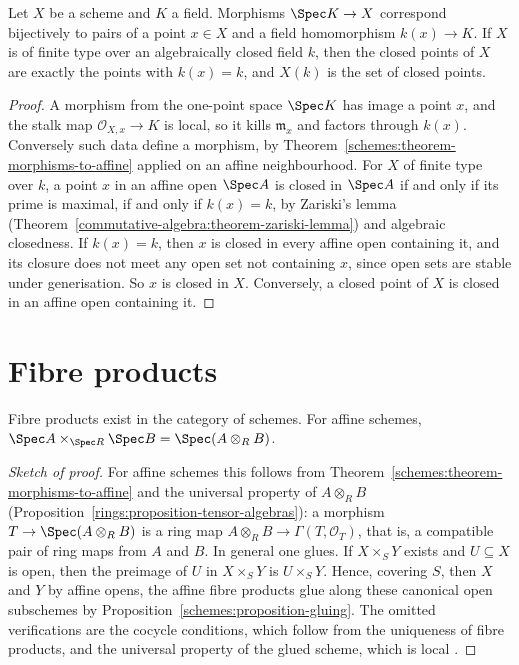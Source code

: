 \begin{proposition}\label{schemes:proposition-points-over-field}
Let $X$ be a scheme and $K$ a field. Morphisms $\Spec K \to X$ correspond bijectively to pairs of a point $x \in X$ and a field homomorphism
$k(x) \to K$. If $X$ is of finite type over an algebraically closed field $k$, then the closed points of $X$ are exactly the points with $k(x) = k$, and
$X(k)$ is the set of closed points.
\end{proposition}

\begin{proof}
A morphism from the one-point space $\Spec K$ has image a point $x$, and the stalk map $\mathcal{O}_{X,x} \to K$ is local, so it kills $\mathfrak{m}_x$ and
factors through $k(x)$. Conversely such data define a morphism, by Theorem~\ref{schemes:theorem-morphisms-to-affine} applied on an affine
neighbourhood. For $X$ of finite type over $k$, a point $x$ in an affine open $\Spec A$ is closed in $\Spec A$ if and only if its prime is maximal,
if and only if $k(x) = k$, by Zariski's lemma (Theorem~\ref{commutative-algebra:theorem-zariski-lemma}) and algebraic closedness. If $k(x) = k$,
then $x$ is closed in every affine open containing it, and its closure does not meet any open set not containing $x$, since open sets are stable
under generisation. So $x$ is closed in $X$. Conversely, a closed point of $X$ is closed in an affine open containing it.
\end{proof}

\section{Fibre products}\label{schemes:section-fibre-products}

\begin{theorem}\label{schemes:theorem-fibre-products}
Fibre products exist in the category of schemes. For affine schemes,
$\Spec A \times_{\Spec R}\Spec B = \Spec(A \otimes_RB)$.
\end{theorem}

\begin{proof}[Sketch of proof]
For affine schemes this follows from Theorem~\ref{schemes:theorem-morphisms-to-affine} and the universal property of $A \otimes_RB$
(Proposition~\ref{rings:proposition-tensor-algebras}): a morphism $T \to \Spec(A \otimes_RB)$ is a ring map $A \otimes_RB \to \Gamma(T, \mathcal{O}_T)$, that is,
a compatible pair of ring maps from $A$ and $B$. In general one glues. If $X \times_SY$ exists and $U \subseteq X$ is open, then the preimage of $U$ in
$X \times_SY$ is $U \times_SY$. Hence, covering $S$, then $X$ and $Y$ by affine opens, the affine fibre products glue along these canonical open
subschemes by Proposition~\ref{schemes:proposition-gluing}. The omitted verifications are the cocycle conditions, which follow from the uniqueness
of fibre products, and the universal property of the glued scheme, which is local \cite[Theorem II.3.3]{hartshorne-ag}.
\end{proof}

